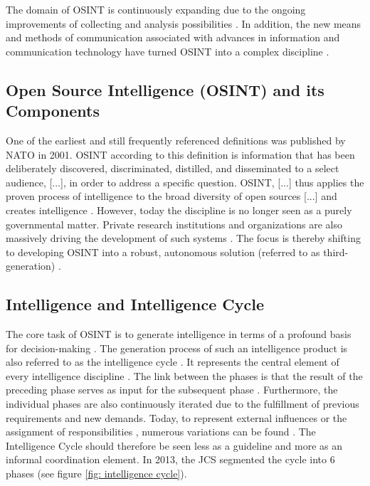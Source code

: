 \documentclass[10pt]{article}
\begin{document}
The domain of OSINT is continuously expanding due to the ongoing improvements of
collecting and analysis possibilities \cite{Ghioni.2023, Williams.2018}. In
addition, the new means and methods of communication associated with advances in information
and communication technology have turned OSINT into a complex discipline
\cite{Benes.2013, Williams.2018}.

\subsection{Open Source Intelligence (OSINT) and its Components}

One of the earliest and still frequently referenced definitions \cite{DosPassos.2017}
was published by NATO in 2001. OSINT according to this definition is information that has been
deliberately discovered, discriminated, distilled, and disseminated to a select audience,
[...], in order to address a specific question. OSINT, [...] thus applies the proven
process of intelligence to the broad diversity of open sources [...] and creates
intelligence \cite{NorthAtlanticTreatyOrganization.2001}. However, today the discipline is no longer seen as a purely governmental
matter. Private research institutions and organizations \cite{Bohm.2021,Mercado.2005} are
also massively driving the development of such systems
\cite{Dokman.2020, Ghioni.2023}. The focus is thereby shifting to
developing OSINT into a robust, autonomous solution (referred to as third-generation) \cite{PastorGalindo.2019}.

\subsection{Intelligence and Intelligence Cycle}

The core task of OSINT is to generate intelligence
in terms of a profound basis for decision-making
\cite{Breakspear.2013,NorthAtlanticTreatyOrganization.2001}. The generation process of such an intelligence product
is also referred to as the intelligence cycle \cite{CentralIntelligenceAgency.1987}.
It represents the central element of every intelligence discipline \cite{Reuser.2017}. The link between the phases is that
the result of the preceding phase serves as input for the subsequent phase
\cite{JointChiefsofStaffU.S.Army.2013}. Furthermore, the individual phases are also continuously
iterated due to the fulfillment of previous requirements and new demands\cite{Gibson.2016}.
Today, to represent external influences or the
assignment of responsibilities \cite{Lowenthal.2020,Phythian.2013}, numerous
variations can be found \cite{Reuser.2017}. The
Intelligence Cycle should therefore be seen less as a guideline and more as an informal
coordination element\cite{Hwang.2022}.
In 2013, the JCS segmented the cycle into 6 phases \cite{JointChiefsofStaffU.S.Army.2013} (see figure \ref{fig: intelligence cycle}).
\end{document}
